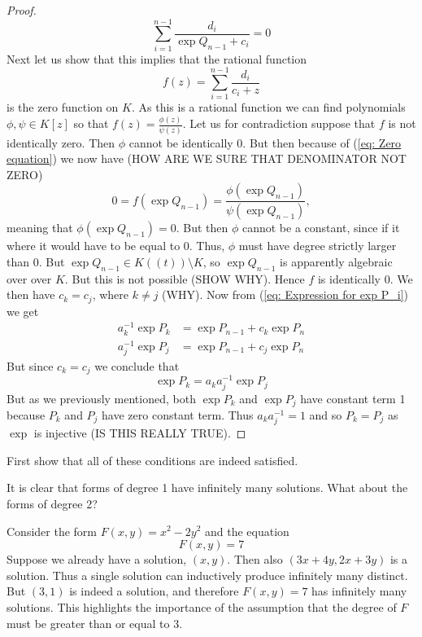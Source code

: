 \documentclass{article}
\begin{document}
\begin{proof}
    \begin{equation}\label{eq: Zero equation}
        \sum_{i=1}^{n-1} \frac{d_i}{\exp Q_{n-1} + c_i} = 0
    \end{equation}
    Next let us show that this implies that the rational function 
    $$f(z) = \sum_{i=1}^{n-1}\frac{d_i}{c_i + z}$$
    is the zero function on $K$. As this is a rational function we can find polynomials $\phi, \psi \in K[z]$ so that $f(z) = \frac{\phi(z)}{\psi(z)}$. Let us for contradiction suppose that $f$ is not identically zero. Then $\phi$ cannot be identically 0. But then because of (\ref{eq: Zero equation}) we now have (HOW ARE WE SURE THAT DENOMINATOR NOT ZERO)
    $$0 = f(\exp Q_{n-1}) = \frac{\phi(\exp Q_{n-1})}{\psi(\exp Q_{n-1})},$$
    meaning that $\phi(\exp Q_{n-1}) = 0$. But then $\phi$ cannot be a constant, since if it where it would have to be equal to 0. Thus, $\phi$ must have degree strictly larger than 0. But $\exp Q_{n-1} \in K((t)) \setminus K$, so $\exp Q_{n-1}$ is apparently algebraic over over $K$. But this is not possible (SHOW WHY). Hence $f$ is identically 0. We then have $c_k = c_j$, where $k \neq j$ (WHY). Now from (\ref{eq: Expression for exp P_i}) we get 
    \begin{align*}
        a_k^{-1} \exp P_k &= \exp P_{n-1} + c_k \exp P_n \\
        a_j^{-1} \exp P_j &= \exp P_{n-1} + c_j \exp P_n
    \end{align*}
    But since $c_k = c_j$ we conclude that
    $$\exp P_k = a_k a_j^{-1} \exp P_j$$ 
    But as we previously mentioned, both $\exp P_k$ and $\exp P_j$ have constant term 1 because $P_k$ and $P_j$ have zero constant term. Thus $a_k a_j^{-1} = 1$ and so $P_k = P_j$ as $\exp$ is injective (IS THIS REALLY TRUE).

\end{proof}


First show that all of these conditions are indeed satisfied. 



It is clear that forms of degree 1 have infinitely many solutions. What about the forms of degree 2?

Consider the form $F(x,y) = x^2 - 2y^2$ and the equation 
$$F(x, y) = 7$$
Suppose we already have a solution, $(x,y)$. Then also $(3x + 4y, 2x + 3y)$ is a solution. Thus a single solution can inductively produce infinitely many distinct. But $(3,1)$ is indeed a solution, and therefore $F(x, y) = 7$ has infinitely many solutions. This highlights the importance of the assumption that the degree of $F$ must be greater than or equal to 3.   
\end{document}
